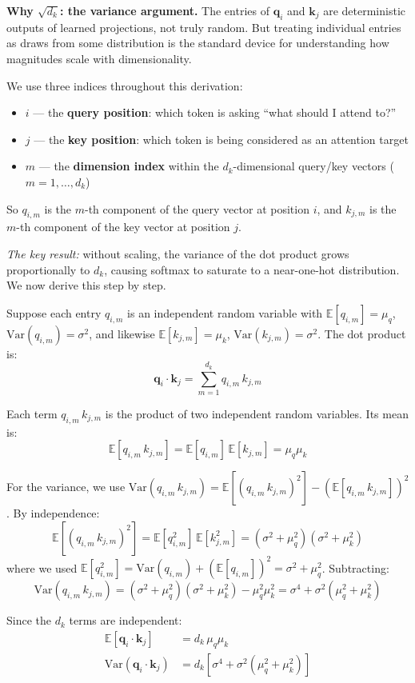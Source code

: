 \begin{notebox}
\textbf{Why $\sqrt{d_k}$: the variance argument.} The entries of $\mathbf{q}_i$ and $\mathbf{k}_j$ are deterministic outputs of learned projections, not truly random. But treating individual entries as draws from some distribution is the standard device for understanding how magnitudes scale with dimensionality.

We use three indices throughout this derivation:
\begin{itemize}
  \item $i$ --- the \textbf{query position}: which token is asking ``what should I attend to?''
  \item $j$ --- the \textbf{key position}: which token is being considered as an attention target
  \item $m$ --- the \textbf{dimension index} within the $d_k$-dimensional query/key vectors ($m = 1, \ldots, d_k$)
\end{itemize}
So $q_{i,m}$ is the $m$-th component of the query vector at position $i$, and $k_{j,m}$ is the $m$-th component of the key vector at position $j$.

\emph{The key result:} without scaling, the variance of the dot product grows proportionally to $d_k$, causing softmax to saturate to a near-one-hot distribution. We now derive this step by step.

Suppose each entry $q_{i,m}$ is an independent random variable with $\mathbb{E}[q_{i,m}] = \mu_q$, $\text{Var}(q_{i,m}) = \sigma^2$, and likewise $\mathbb{E}[k_{j,m}] = \mu_k$, $\text{Var}(k_{j,m}) = \sigma^2$. The dot product is:
\[
\mathbf{q}_i \cdot \mathbf{k}_j = \sum_{m=1}^{d_k} q_{i,m}\, k_{j,m}
\]

Each term $q_{i,m}\, k_{j,m}$ is the product of two independent random variables. Its mean is:
\[
\mathbb{E}[q_{i,m}\, k_{j,m}] = \mathbb{E}[q_{i,m}]\,\mathbb{E}[k_{j,m}] = \mu_q \mu_k
\]

For the variance, we use $\text{Var}(q_{i,m}\, k_{j,m}) = \mathbb{E}[(q_{i,m}\, k_{j,m})^2] - (\mathbb{E}[q_{i,m}\, k_{j,m}])^2$. By independence:
\[
\mathbb{E}[(q_{i,m}\, k_{j,m})^2] = \mathbb{E}[q_{i,m}^2]\,\mathbb{E}[k_{j,m}^2] = (\sigma^2 + \mu_q^2)(\sigma^2 + \mu_k^2)
\]
where we used $\mathbb{E}[q_{i,m}^2] = \text{Var}(q_{i,m}) + (\mathbb{E}[q_{i,m}])^2 = \sigma^2 + \mu_q^2$. Subtracting:
\[
\text{Var}(q_{i,m}\, k_{j,m}) = (\sigma^2 + \mu_q^2)(\sigma^2 + \mu_k^2) - \mu_q^2 \mu_k^2 = \sigma^4 + \sigma^2(\mu_q^2 + \mu_k^2)
\]

Since the $d_k$ terms are independent:
\begin{align}
\mathbb{E}[\mathbf{q}_i \cdot \mathbf{k}_j] &= d_k\, \mu_q \mu_k \\
\text{Var}(\mathbf{q}_i \cdot \mathbf{k}_j) &= d_k[\sigma^4 + \sigma^2(\mu_q^2 + \mu_k^2)]
\end{align}


\end{notebox}
